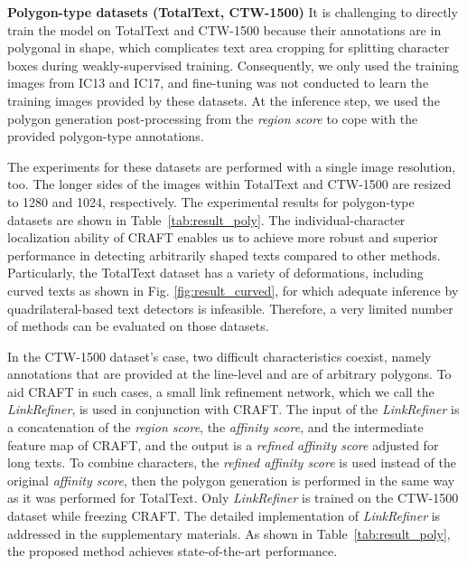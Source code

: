 \documentclass[10pt,twocolumn,letterpaper]{article}
\begin{document}
\noindent\textbf{Polygon-type datasets (TotalText, CTW-1500)} 
It is challenging to directly train the model on TotalText and CTW-1500 because their annotations are in polygonal in shape, which complicates text area cropping for splitting character boxes during weakly-supervised training.
Consequently, we only used the training images from IC13 and IC17, and fine-tuning was not conducted to learn the training images provided by these datasets. At the inference step, we used the polygon generation post-processing from the \textit{region score} to cope with the provided polygon-type annotations.


The experiments for these datasets are performed with a single image resolution, too. The longer sides of the images within TotalText and CTW-1500 are resized to 1280 and 1024, respectively.
The experimental results for polygon-type datasets are shown in Table~\ref{tab:result_poly}. The individual-character localization ability of CRAFT enables us to achieve more robust and superior performance in detecting arbitrarily shaped texts compared to other methods. Particularly, the TotalText dataset has a variety of deformations, including curved texts as shown in Fig. \ref{fig:result_curved}, for which adequate inference by quadrilateral-based text detectors is infeasible. Therefore, a very limited number of methods can be evaluated on those datasets.



In the CTW-1500 dataset's case, two difficult characteristics coexist, namely annotations that are provided at the line-level and are of arbitrary polygons.
To aid CRAFT in such cases, a small link refinement network, which we call the \textit{LinkRefiner}, is used in conjunction with CRAFT. The input of the \textit{LinkRefiner} is a concatenation of the \textit{region score}, the \textit{affinity score}, and the intermediate feature map of CRAFT, and the output is a \textit{refined affinity score} adjusted for long texts. To combine characters, the \textit{refined affinity score} is used instead of the original \textit{affinity score}, then the polygon generation is performed in the same way as it was performed for TotalText. Only \textit{LinkRefiner} is trained on the CTW-1500 dataset while freezing CRAFT. The detailed implementation of \textit{LinkRefiner} is addressed in the supplementary materials.
As shown in Table~\ref{tab:result_poly}, the proposed method achieves state-of-the-art performance.
\end{document}
